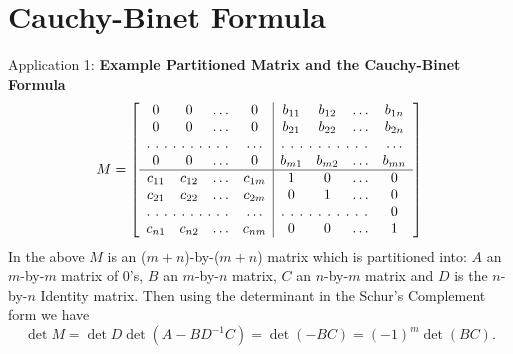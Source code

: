
\section{Cauchy-Binet Formula}

Application 1: {\bf Example Partitioned Matrix and the Cauchy-Binet Formula}
\begin{equation}
M =
\left[
\begin{array}{cccc|cccc}
0 & 0 & \hdots & 0 & b_{11} & b_{12} & \hdots & b_{1n}\\
0 & 0 & \hdots & 0 & b_{21} & b_{22} & \hdots & b_{2n}\\
\hdotsfor[2]{3} & \hdots &\hdotsfor[2]{3} & \hdots\\
0 & 0 & \hdots & 0 & b_{m1} & b_{m2} & \hdots & b_{mn}\\
\hline
c_{11} & c_{12} &\hdots & c_{1m} & 1 & 0& \hdots & 0\\
c_{21} & c_{22} &\hdots & c_{2m} & 0 & 1& \hdots & 0\\
\hdotsfor[2]{3} & \hdots & \hdotsfor[2]{3} & 0\\
c_{n1} & c_{n2} &\hdots & c_{nm} & 0 & 0& \hdots& 1
\end{array} \right]
\end{equation}
In the above $M$ is an ($m+n$)-by-($m+n$) matrix which is partitioned into: $A$ an $m$-by-$m$ matrix of 0's, $B$ an $m$-by-$n$ matrix, $C$ an $n$-by-$m$ matrix and $D$ is the $n$-by-$n$ Identity matrix. Then using the determinant in the Schur's Complement form we have
$$\det M = \det D \det(A - BD^{-1}C) = \det (-BC) = (-1)^m \det(BC).$$\\

